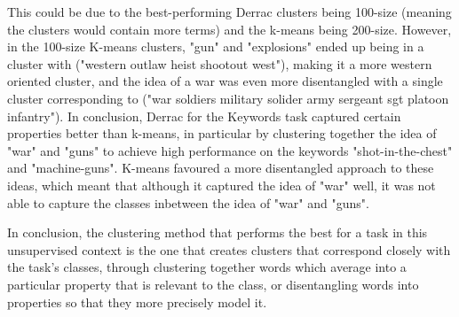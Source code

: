 This could be due to the best-performing Derrac clusters being 100-size (meaning the clusters would contain more terms) and the k-means being 200-size. However, in the 100-size K-means clusters, "gun" and "explosions" ended up being in a cluster with ("western outlaw heist shootout west"), making it a more western oriented cluster, and the idea of a war was even more disentangled with a single cluster corresponding to ("war soldiers military solider army sergeant sgt platoon infantry"). In conclusion, Derrac for the Keywords task captured certain properties better than k-means, in particular by clustering together the idea of "war" and "guns" to achieve high performance on the keywords "shot-in-the-chest" and "machine-guns". K-means favoured a more disentangled approach to these ideas, which meant that although it captured the idea of "war" well, it was not able to capture the classes inbetween the idea of "war" and "guns".

In conclusion, the clustering method that performs the best for a task in this unsupervised context is the one that creates clusters that correspond closely with the task's classes, through clustering together words which average into a particular property that is relevant to the class, or disentangling words into properties so that they more precisely model it.




